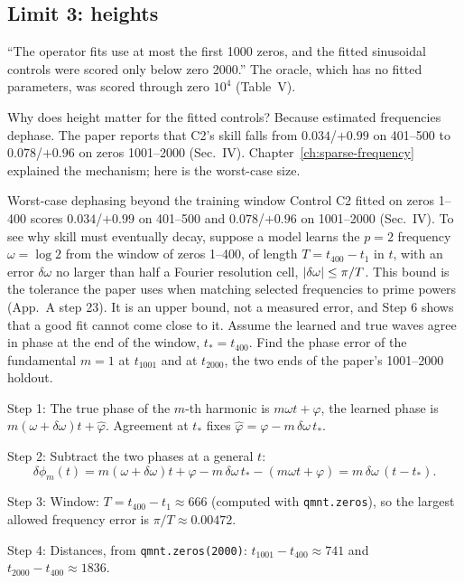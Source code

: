 \subsection{Limit 3: heights}

``The operator fits use at most the first 1000 zeros, and the fitted sinusoidal controls were scored only below zero 2000.'' The oracle, which has no fitted parameters, was scored through zero $10^4$ (Table~V).

Why does height matter for the fitted controls? Because estimated frequencies dephase. The paper reports that C2's skill falls from $0.034$/$+0.99$ on 401--500 to $0.078$/$+0.96$ on zeros 1001--2000 (Sec.~IV). Chapter~\ref{ch:sparse-frequency} explained the mechanism; here is the worst-case size.

\begin{sample}{Worst-case dephasing beyond the training window}
Control C2 fitted on zeros 1--400 scores $0.034$/$+0.99$ on 401--500 and $0.078$/$+0.96$ on 1001--2000 (Sec.~IV). To see why skill must eventually decay, suppose a model learns the $p=2$ frequency $\omega=\log 2$ from the window of zeros 1--400, of length $T=t_{400}-t_1$ in $t$, with an error $\delta\omega$ no larger than half a Fourier resolution cell, $\left\lvert \delta\omega\right\rvert\le\pi/T$. This bound is the tolerance the paper uses when matching selected frequencies to prime powers (App.~A step 23). It is an upper bound, not a measured error, and Step 6 shows that a good fit cannot come close to it. Assume the learned and true waves agree in phase at the end of the window, $t_*=t_{400}$. Find the phase error of the fundamental $m=1$ at $t_{1001}$ and at $t_{2000}$, the two ends of the paper's 1001--2000 holdout.

Step 1: The true phase of the $m$-th harmonic is $m\omega t+\varphi$, the learned phase is $m(\omega+\delta\omega)t+\hat\varphi$. Agreement at $t_*$ fixes $\hat\varphi=\varphi-m\,\delta\omega\,t_*$.

Step 2: Subtract the two phases at a general $t$:
\begin{equation}
\delta\phi_m(t)=m(\omega+\delta\omega)t+\varphi-m\,\delta\omega\,t_*-(m\omega t+\varphi)=m\,\delta\omega\,(t-t_*).
\label{eq:paper-critique-dephase}
\end{equation}

Step 3: Window: $T=t_{400}-t_1\approx666$ (computed with \texttt{qmnt.zeros}), so the largest allowed frequency error is $\pi/T\approx0.00472$.

Step 4: Distances, from \texttt{qmnt.zeros(2000)}: $t_{1001}-t_{400}\approx741$ and $t_{2000}-t_{400}\approx1836$.


\end{sample}
